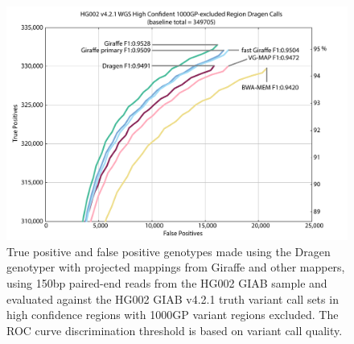 \documentclass[11pt]{ucscthesis}
\begin{document}
\begin{figure}[p]
    \centering
    \includegraphics[width=\linewidth]{HG002_v4.2.1_high_conf.35x_150bp.wgs.vcfevalroc.1000GP_excluded.pdf}
    \caption[Genotyping evaluation for the Dragen genotyper with projected mappings from Giraffe and other mappers in 1000GP excluded regions]{True positive and false positive genotypes made using the Dragen genotyper with projected mappings from Giraffe and other mappers, using 150bp paired-end reads from the HG002 GIAB sample and evaluated against the HG002 GIAB v4.2.1 truth variant call sets in high confidence regions with 1000GP variant regions excluded. The ROC curve discrimination threshold is based on variant call quality.}
    \label{fig:150bp_genotyping_1000GP_excluded}
\end{figure}
\end{document}
